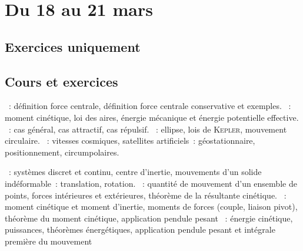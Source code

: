 \documentclass[a4paper, 12pt, final, garamond]{book}
\begin{document}
\setcounter{chapter}{20}

\chapter{Du 18 au 21 mars}

\section{Exercices uniquement}

\section{Cours et exercices}
\begin{enumerate}[label=\Roman*]
	~: définition force centrale,
	définition force centrale conservative et exemples.
	~: moment cinétique, loi des aires, énergie
	mécanique et énergie potentielle effective.
	~: cas général, cas attractif, cas
	répulsif.
	~: ellipse, lois de \textsc{Kepler}, mouvement
	circulaire.
	~: vitesses cosmiques, satellites
	artificiels~: géostationnaire, positionnement, circumpolaires.
\end{enumerate}

\begin{enumerate}[label=\Roman*]
	~: systèmes discret et continu, centre
	d'inertie, mouvements d'un solide indéformable~: translation, rotation.
	~: quantité de mouvement d'un ensemble de points, forces
	intérieures et extérieures, théorème de la résultante cinétique.
	~: moment cinétique et moment
	d'inertie, moments de forces (couple, liaison pivot), théorème du moment
	cinétique, application pendule pesant
	~: énergie cinétique, puissances,
	théorèmes énergétiques, application pendule pesant et intégrale première du
	mouvement
\end{enumerate}
\end{document}

